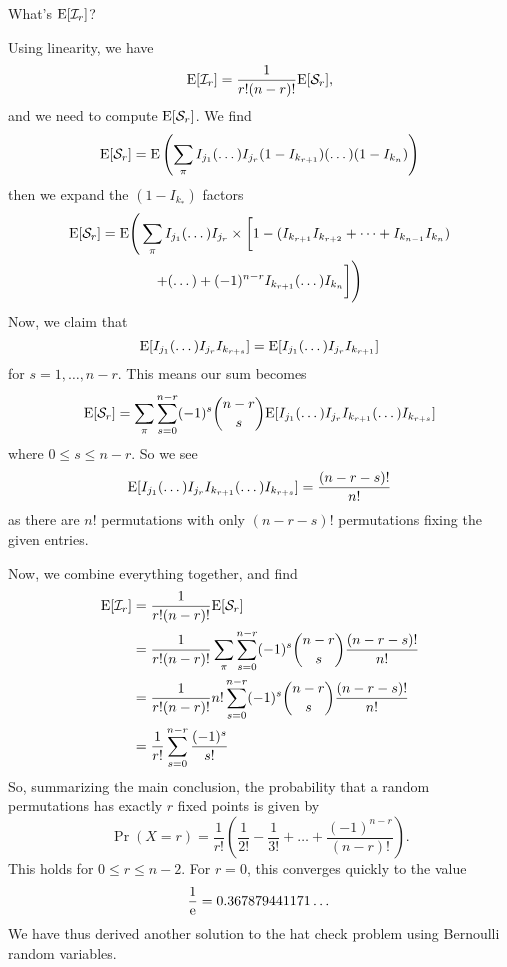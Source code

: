 What's $\mathrm{E}[\mathcal{I}_{r}]$?

\medbreak
Using linearity, we have
\begin{equation}
\mathrm{E}[\mathcal{I}_r]=\frac{1}{r!(n-r)!}\mathrm{E}[\mathcal{S}_{r}],
\end{equation}
and we need to compute $\mathrm{E}[\mathcal{S}_{r}]$. We find
\begin{equation}
\mathrm{E}[\mathcal{S}_r] = \mathrm{E}\left(\sum_{\pi}I_{j_1}(\dots)I_{j_r}(1-I_{k_{r+1}})(\dots)(1-I_{k_n})\right)
\end{equation}
then we expand the $(1-I_{k_{\textstyle *}})$ factors
\begin{multline}
\mathrm{E}[\mathcal{S}_r] = \mathrm{E}\Bigg(\sum_{\pi}I_{j_1}(\dots)I_{j_r}
\times\biggl[1-(I_{k_{r+1}}I_{k_{r+2}}+\dots+I_{k_{n-1}}I_{k_n}) \\
+(\dots)+(-1)^{n-r}I_{k_{r+1}}(\dots)I_{k_n}\biggr]\Bigg)
\end{multline}
Now, we claim that
\begin{equation}
\mathrm{E}[I_{j_1}(\dots)I_{j_{r}}I_{k_{r+s}}]=\mathrm{E}[I_{j_1}(\dots)I_{j_{r}}I_{k_{r+1}}]
\end{equation}
for $s=1,\dots,n-r$. This means our sum becomes
\begin{equation}
\mathrm{E}[\mathcal{S}_r]=\sum_{\pi}\sum^{n-r}_{s=0}(-1)^{s}\binom{n-r}{s}
\mathrm{E}[I_{j_1}(\dots)I_{j_r}I_{k_{r+1}}(\dots)I_{k_{r+s}}]
\end{equation}
where $0\leq s\leq n-r$. So we see
\begin{equation}
\mathrm{E}[I_{j_1}(\dots)I_{j_r}I_{k_{r+1}}(\dots)I_{k_{r+s}}]=\frac{(n-r-s)!}{n!}
\end{equation}
as there are $n!$ permutations with only $(n-r-s)!$ permutations fixing the 
given entries.

Now, we combine everything together, and find
\begin{subequations}
\begin{align}
\mathrm{E}[\mathcal{I}_r] &=
\frac{1}{r!(n-r)!}\mathrm{E}[\mathcal{S}_r]\\
&=\frac{1}{r!(n-r)!}\sum_{\pi}\sum^{n-r}_{s=0}(-1)^{s}\binom{n-r}{s}\frac{(n-r-s)!}{n!}\\
&=\frac{1}{r!(n-r)!}n!\sum^{n-r}_{s=0}(-1)^{s}\binom{n-r}{s}\frac{(n-r-s)!}{n!}\\
&=\frac{1}{r!}\sum^{n-r}_{s=0}\frac{(-1)^{s}}{s!}
\end{align}
\end{subequations}
So, summarizing the main conclusion, the probability that a random permutations 
has exactly $r$ fixed points is given by
\begin{equation}
\Pr(X=r)=\frac{1}{r!}\left(\frac{1}{2!}-\frac{1}{3!}+\dots+\frac{(-1)^{n-r}}{(n-r)!}\right).
\end{equation}
This holds for $0\leq r\leq n-2$. For $r=0$, this converges quickly to the value
\begin{equation}
\frac{1}{\mathrm{e}}=0.367 879 441 171\dots
\end{equation}
We have thus derived another solution to the hat check problem using Bernoulli 
random variables.

